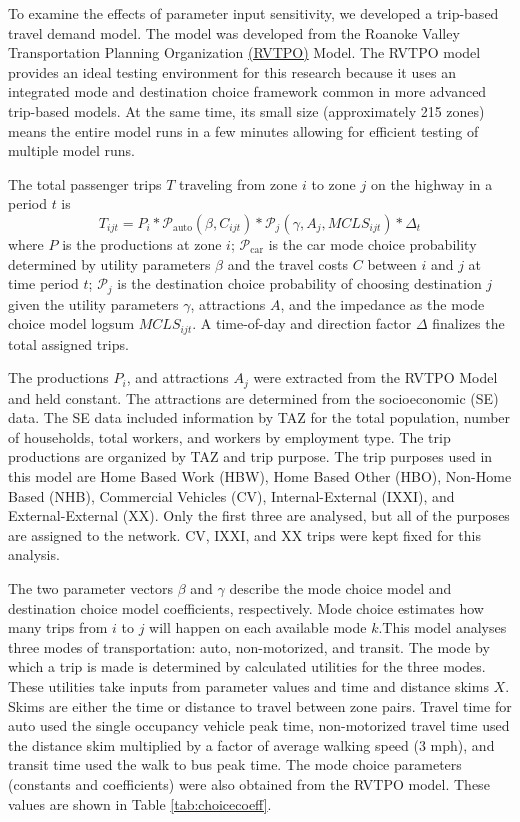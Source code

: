 \documentclass[fancy, masters,twoside]{byuthesis}
\begin{document}
To examine the effects of parameter input sensitivity, we developed a trip-based travel demand model. The model was developed from the Roanoke Valley Transportation Planning Organization \href{https://github.com/xinwangvdot/rvtpo}{(RVTPO)} Model. The RVTPO model provides an ideal testing environment for this research because it uses an integrated mode and destination choice framework common in more advanced trip-based models. At the same time, its small size (approximately 215 zones) means the entire model runs in a few minutes allowing for efficient testing of multiple model runs.

The total passenger trips \(T\) traveling from zone \(i\) to zone \(j\) on the highway in a period \(t\) is
\begin{equation}
T_{ijt} = P_i * \mathcal{P}_{\mathrm{auto}}(\beta, C_{ijt}) * \mathcal{P}_j(\gamma, A_j, MCLS_{ijt}) * \Delta_t
\label{eq:trips}
\end{equation}
where \(P\) is the productions at zone \(i\); \(\mathcal{P}_{\mathrm{car}}\) is the car mode choice probability determined by utility parameters \(\beta\) and the travel costs \(C\) between \(i\) and \(j\) at time period \(t\); \(\mathcal{P}_{j}\) is the destination choice probability of choosing destination \(j\) given the utility parameters \(\gamma\), attractions \(A\), and the impedance as the mode choice model logsum \(MCLS_{ijt}\). A time-of-day and direction factor \(\Delta\) finalizes the total assigned trips.

The productions \(P_i\), and attractions \(A_j\) were extracted from the RVTPO Model and held constant. The attractions are determined from the socioeconomic (SE) data. The SE data included information by TAZ for the total population, number of households, total workers, and workers by employment type. The trip productions are organized by TAZ and trip purpose. The trip purposes used in this model are Home Based Work (HBW), Home Based Other (HBO), Non-Home Based (NHB), Commercial Vehicles (CV), Internal-External (IXXI), and External-External (XX). Only the first three are analysed, but all of the purposes are assigned to the network. CV, IXXI, and XX trips were kept fixed for this analysis.

The two parameter vectors \(\beta\) and \(\gamma\) describe the mode choice model and destination choice model coefficients, respectively. Mode choice estimates how many trips from \(i\) to \(j\) will happen on each available mode \(k\).This model analyses three modes of transportation: auto, non-motorized, and transit. The mode by which a trip is made is determined by calculated utilities for the three modes. These utilities take inputs from parameter values and time and distance skims \(X\). Skims are either the time or distance to travel between zone pairs. Travel time for auto used the single occupancy vehicle peak time, non-motorized travel time used the distance skim multiplied by a factor of average walking speed (3 mph), and transit time used the walk to bus peak time. The mode choice parameters (constants and coefficients) were also obtained from the RVTPO model. These values are shown in Table \ref{tab:choicecoeff}.
\end{document}
